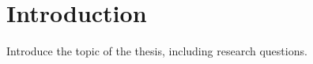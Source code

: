 \chapter{Introduction}\label{ch:intro}

Introduce the topic of the thesis, including research questions.